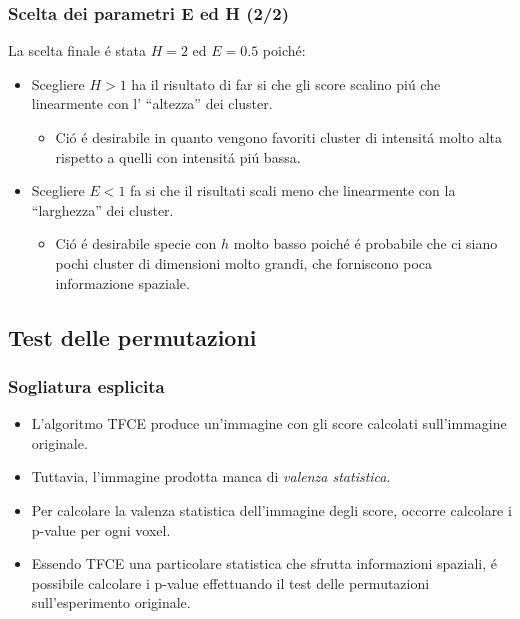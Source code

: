 \documentclass{beamer}
\begin{document}
\begin{frame}
\frametitle{Scelta dei parametri E ed H (2/2)}
La scelta finale \'e stata $H = 2$ ed $E = 0.5$ poich\'e:
\bigskip
\begin{itemize}

\item Scegliere $H > 1$ ha il risultato di far si che gli score scalino pi\'u che linearmente con l' ``altezza'' dei cluster.
\begin{itemize}
\item Ci\'o \'e desirabile in quanto vengono favoriti cluster di intensit\'a molto alta rispetto a quelli con intensit\'a pi\'u bassa.
\end{itemize}
\medskip
\item Scegliere $E < 1$ fa si che il risultati scali meno che linearmente con la ``larghezza'' dei cluster.
\begin{itemize}
\item Ci\'o \'e desirabile specie con $h$ molto basso poich\'e \'e probabile che ci siano pochi cluster di dimensioni molto grandi, che forniscono poca informazione spaziale.
\end{itemize}
\end{itemize}
\end{frame}

\subsection{Test delle permutazioni}
\begin{frame}
\frametitle{Sogliatura esplicita}
\begin{itemize}
\item {}L'algoritmo TFCE produce un'immagine con gli score calcolati sull'immagine originale.

\item {}Tuttavia, l'immagine prodotta manca di \emph{valenza statistica}.

\item {}Per calcolare la valenza statistica dell'immagine degli score, occorre calcolare i \alert{p-value} per ogni voxel.

\item {}Essendo TFCE una particolare statistica che sfrutta informazioni spaziali, \'e possibile calcolare i p-value effettuando il \alert{test delle permutazioni} sull'esperimento originale.
\end{itemize}
\end{frame}
\end{document}
